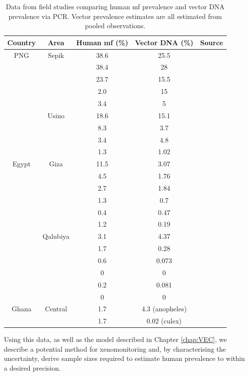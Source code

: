 \begin{table}[h]
    \centering
    \begin{tabular}{c|c|c|c|c}
        Country & Area & Human mf (\%) & Vector DNA (\%) & Source  \\
        \hline
        PNG & Sepik & 38.6 & 25.5 & \cite{Reimer2013_insecticidal} \\
         &  & 38.4 & 28 & \\
         &  & 23.7 & 15.5 & \\
         &  & 2.0 & 15 &  \\
         &  & 3.4 & 5 &  \\
        & Usino & 18.6 & 15.1 & \cite{Weil2008} \\
         &  & 8.3 & 3.7 & \\
         &  & 3.4 & 4.8 &  \\
         &  & 1.3 & 1.02 &  \\
         \hline
        Egypt & Giza & 11.5 & 3.07 & \cite{Farid2007,Ramzy2006} \\
         &  & 4.5 & 1.76 &  \\
         &  & 2.7 & 1.84 &  \\
         &  & 1.3 & 0.7 &  \\
         &  & 0.4 & 0.47 &  \\
         &  & 1.2 & 0.19 &  \\
         & Qalubiya & 3.1 & 4.37 & \cite{Farid2007,Ramzy2006} \\
        &  & 1.7 & 0.28 &  \\
        &  & 0.6 & 0.073 &  \\
        &  & 0 & 0 &  \\
        &  & 0.2 & 0.081 & \\
        &  & 0 & 0 & \\
        \hline
        Ghana & Central & 1.7 & 4.3 (anopheles) & \cite{Owusu2015} \\
         &  & 1.7 & 0.02 (culex) & 
    \end{tabular}
    \caption{Data from field studies comparing human mf prevalence and vector DNA prevalence via PCR. Vector prevalence estimates are all estimated from pooled observations.}
    \label{tab:MXdata}
\end{table}

Using this data, as well as the model described in Chapter \ref{chap:VEC}, we describe a potential method for xenomonitoring and, by characterising the uncertainty, derive sample sizes required to estimate human prevalence to within a desired precision.


